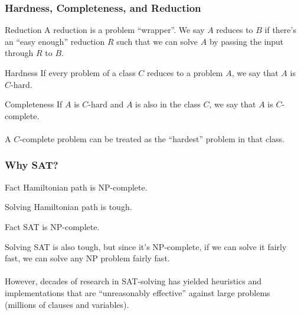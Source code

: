 \documentclass{beamer}
\begin{document}
\begin{frame}
    \frametitle{Hardness, Completeness, and Reduction}
    \alert{Reduction} A reduction is a problem ``wrapper''.
    We say $A$ reduces to $B$ if there's an ``easy enough''
    reduction $R$ such that we can solve $A$ by passing
    the input through $R$ to $B$.

    \begin{figure}[H]
        \centering
    \end{figure}

    \alert{Hardness} If every problem of a class $C$ reduces to a
    problem $A$, we say that $A$ is $C$-hard.

    \alert{Completeness} If $A$ is $C$-hard and $A$ is also in the class $C$,
    we say that $A$ is $C$-complete.
    \\~\\
    A $C$-complete problem can be treated as the ``hardest'' problem in that class.
\end{frame}

\begin{frame}
    \frametitle{Why SAT?}
    \begin{block}{Fact}
        Hamiltonian path is NP-complete.
    \end{block}
    Solving Hamiltonian path is tough.
    \begin{block}{Fact}
        SAT is NP-complete.
    \end{block}
    Solving SAT is also tough, but since it's NP-complete,
    if we can solve it fairly fast, we can solve any NP problem
    fairly fast.
    \\~\\
    However, decades of research in SAT-solving has yielded heuristics
    and implementations that are ``unreasonably effective'' against
    large problems (millions of clauses and variables).
\end{frame}
\end{document}
